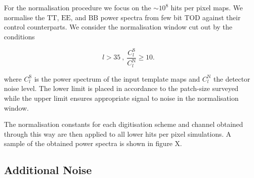 \documentclass[apj]{emulateapj}
\begin{document}
For the normalisation procedure we focus on the $\sim 10^8$ hits per pixel maps. We normalise the $\mathrm{TT}$, $\mathrm{EE}$, and $\mathrm{BB}$ power spectra from few bit TOD against their control counterparts. We consider the normalisation window cut out by the conditions

\begin{equation} l > 35 \> , \> \frac{C_l^{\mathrm{S}}}{C_l^{\mathrm{N}}} \geq 10. \end{equation}

where $C_l^{\mathrm{S}}$ is the power spectrum of the input template maps and $C_l^{\mathrm{N}}$ the detector noise level. The lower limit is placed in accordance to the patch-size surveyed while the upper limit ensures appropriate signal to noise in the normalisation window.

The normalisation constants for each digitisation scheme and channel obtained through this way are then applied to all lower hits per pixel simulations. A sample of the obtained power spectra is shown in figure X.




\subsection{Additional Noise}
\label{subsec:additionalnoise}

\end{document}

